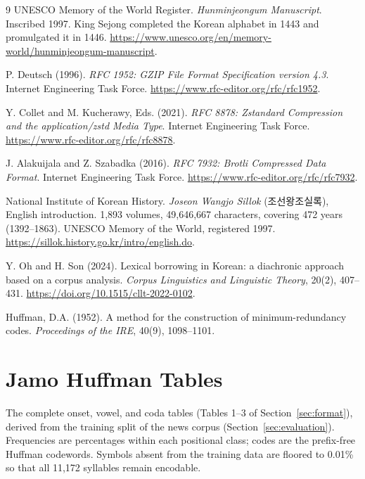 \documentclass[conference]{IEEEtran}
\begin{document}
\begin{thebibliography}{9}
UNESCO Memory of the World Register.
\emph{Hunminjeongum Manuscript}. Inscribed 1997.
King Sejong completed the Korean alphabet in 1443 and promulgated it in 1446.
\url{https://www.unesco.org/en/memory-world/hunminjeongum-manuscript}.

P. Deutsch (1996).
\emph{RFC 1952: GZIP File Format Specification version 4.3}.
Internet Engineering Task Force.
\url{https://www.rfc-editor.org/rfc/rfc1952}.

Y. Collet and M. Kucherawy, Eds. (2021).
\emph{RFC 8878: Zstandard Compression and the application/zstd Media Type}.
Internet Engineering Task Force.
\url{https://www.rfc-editor.org/rfc/rfc8878}.

J. Alakuijala and Z. Szabadka (2016).
\emph{RFC 7932: Brotli Compressed Data Format}.
Internet Engineering Task Force.
\url{https://www.rfc-editor.org/rfc/rfc7932}.

National Institute of Korean History.
\emph{Joseon Wangjo Sillok} (조선왕조실록), English introduction.
1,893 volumes, 49,646,667 characters, covering 472 years (1392--1863).
UNESCO Memory of the World, registered 1997.
\url{https://sillok.history.go.kr/intro/english.do}.

Y. Oh and H. Son (2024).
Lexical borrowing in Korean: a diachronic approach based on a corpus analysis.
\emph{Corpus Linguistics and Linguistic Theory}, 20(2), 407--431.
\url{https://doi.org/10.1515/cllt-2022-0102}.

Huffman, D.A. (1952).
A method for the construction of minimum-redundancy codes.
\emph{Proceedings of the IRE}, 40(9), 1098--1101.

\end{thebibliography}

\appendix
\section{Jamo Huffman Tables}
\label{app:tables}

The complete onset, vowel, and coda tables (Tables 1--3 of
Section~\ref{sec:format}), derived from the training split of the news corpus
(Section~\ref{sec:evaluation}). Frequencies are percentages within each
positional class; codes are the prefix-free Huffman codewords. Symbols absent
from the training data are floored to 0.01\% so that all 11,172 syllables remain
encodable.
\end{document}
